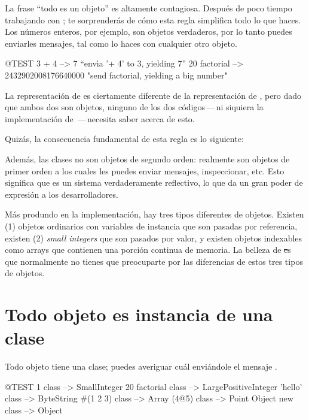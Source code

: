 \documentclass[a4paper,10pt,twoside]{book}
\begin{document}

La frase ``todo es un objeto'' es altamente contagiosa.
Despu\'es de poco tiempo trabajando con \st, te sorprender\'as de c\'omo esta regla simplifica todo lo que haces.  
Los n\'umeros enteros, por ejemplo, son objetos verdaderos, por lo tanto puedes enviarles mensajes, tal como lo haces con cualquier otro objeto.


\begin{code}{@TEST}
3 + 4            --> 7    ``env\'\i{}a '+ 4' to 3, yielding 7''
20 factorial  --> 2432902008176640000   "send factorial, yielding a big number"
\end{code}

La representaci\'on de  es ciertamente diferente de la representaci\'on de , pero dado que ambos dos son objetos, ninguno de los dos c\'odigos\,---\,ni siquiera la implementaci\'on de \,---\,necesita saber acerca de esto.  

Quiz\'as, la consecuencia fundamental de esta regla es lo siguiente:

Adem\'as, las clases no son objetos de segundo orden: realmente son objetos de primer orden a los cuales les puedes enviar mensajes, inspeccionar, etc.
Esto significa que \pharo es un sistema verdaderamente reflectivo, lo que da un gran poder de expresi\'on a los desarrolladores.

M\'as produndo en la implementaci\'on, hay tres tipos diferentes de objetos. Existen (1) objetos ordinarios con variables de instancia que son pasadas por referencia, existen (2) \emph{small integers} %
que son pasados por valor, y existen objetos indexables como arrays %
 que contienen una porci\'on continua de memoria. La belleza de \st es que normalmente no tienes que preocuparte por las diferencias de estos tres tipos de objetos. 


\section{Todo objeto es instancia de una clase}


Todo objeto tiene una clase; puedes averiguar cu\'al envi\'andole el mensaje .

\begin{code}{@TEST}
1 class                 --> SmallInteger
20 factorial class --> LargePositiveInteger
'hello' class          --> ByteString
#(1 2 3) class       --> Array
(4@5) class         --> Point
Object new class --> Object
\end{code}
\end{document}
